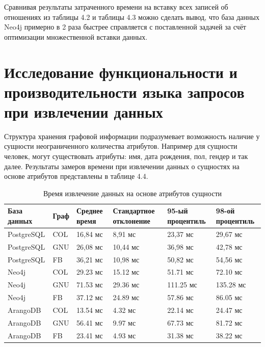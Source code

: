 Сравнивая результаты затраченного времени на вставку всех записей об отношениях из таблицы 4.2 и таблицы 4.3 можно сделать вывод, что база
данных Neo4j примерно в 2 раза быстрее справляется с поставленной задачей за счёт оптимизации множественной вставки данных.


\section{Исследование функциональности и производительности языка запросов при извлечении данных}

Структура хранения графовой информации подразумевает возможность наличие у сущности неограниченного количества атрибутов. Например для
сущности человек, могут существовать атрибуты: имя, дата рождения, пол, гендер и так далее. Результаты замеров времени при извлечении
данных о сущностях на основе атрибутов представлены в таблице 4.4.

\begin{table} [htbp]
    \centering\small
    \caption{Время извлечение данных на основе атрибутов сущности}
    \begin{tabular}{|p{3cm}|p{1cm}|p{2cm}|p{2cm}|p{2cm}|p{2cm}|}
        \hline
        База данных & Граф & Среднее время & Стандартное отклонение & 95-ый процентиль & 98-ой процентиль \\ \hline
        PostgreSQL  & COL  & 16,84 мс      & 8,91 мс                & 23,37 мс         & 29,67 мс         \\ \hline
        PostgreSQL  & GNU  & 26,08 мс      & 10,44 мс               & 36,98 мс         & 42,78 мс         \\ \hline
        PostgreSQL  & FB   & 36,21 мс      & 10,98 мс               & 50,82 мс         & 54,56 мс         \\ \hline
        Neo4j       & COL  & 29.23 мс      & 15.12 мс               & 51.71 мс         & 72.10 мс         \\ \hline
        Neo4j       & GNU  & 71.53 мс      & 29.36 мс               & 111.25 мс        & 135.28 мс        \\ \hline
        Neo4j       & FB   & 37.12 мс      & 24.89 мс               & 57.86 мс         & 86.05 мс         \\ \hline
        ArangoDB    & COL  & 13.54 мс      & 4.32 мс                & 22.14 мс         & 24.47 мс         \\ \hline
        ArangoDB    & GNU  & 56.41 мс      & 9.97 мс                & 67.73 мс         & 81.72 мс         \\ \hline
        ArangoDB    & FB   & 23.41 мс      & 4.93 мс                & 31.38 мс         & 38.22 мс         \\ \hline
    \end{tabular}
    \normalsize
\end{table}

